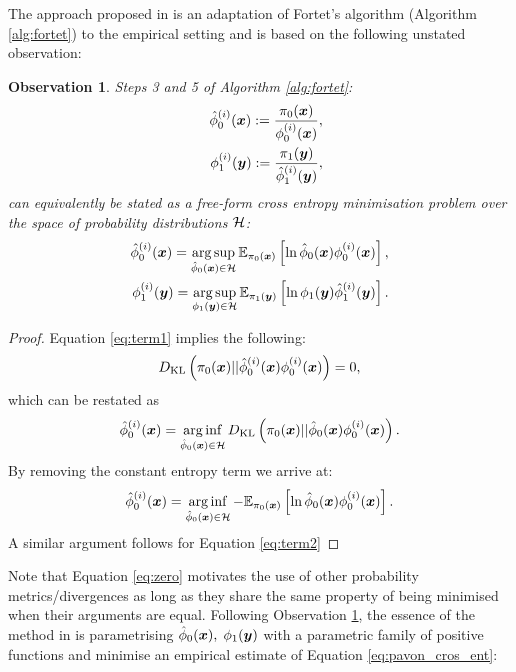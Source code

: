 \documentclass[a4paper,12pt,twoside,openright]{report}
\newtheorem{observation}{Observation}
\theoremstyle{definition}
\begin{document}
The approach proposed in \cite{pavon2018data} is an adaptation of Fortet's algorithm (Algorithm \ref{alg:fortet}) to the empirical setting and is based on the following unstated observation:
\begin{observation}\label{obs:pavon}
Steps 3 and 5 of Algorithm \ref{alg:fortet}:
\begin{align}
    {\hat{\phi}}_0^{(i)}({\bm{x}}) := \frac{\pi_0({\bm{x}})}{\phi_0^{(i)}({\bm{x}})}, \label{eq:term1}\\    \quad \phi_1^{(i)}({\bm{y}}) := \frac{\pi_1({\bm{y}})}{{\hat{\phi}}_1^{(i)}({\bm{y}})} , \label{eq:term2}
\end{align}
can equivalently be stated as a free-form cross entropy minimisation problem over the space of probability distributions ${\mathcal{H}}$:
\begin{align} \label{eq:pavon_cros_ent}
   {\hat{\phi}}_0^{(i)}({\bm{x}})= \operatorname*{arg\,sup}_{{\hat{\phi}}_0({\bm{x}}) \in {\mathcal{H}}} \mathbb{E}_{\pi_0({\bm{x}})} \left[\operatorname{ln} {\hat{\phi}}_0({\bm{x}})   \phi_0^{(i)}({\bm{x}})\right],\\
   \phi_1^{(i)}({\bm{y}})= \operatorname*{arg\,sup}_{\phi_1({\bm{y}}) \in {\mathcal{H}}} \mathbb{E}_{\pi_1({\bm{y}})} \left[\operatorname{ln} \phi_1({\bm{y}})   {\hat{\phi}}_1^{(i)}({\bm{y}})\right].
\end{align}
\end{observation}
\begin{proof}
Equation \ref{eq:term1}  implies the following:
\begin{align}\label{eq:zero}
    D_{\mathrm{KL}}\left(\pi_0({\bm{x}}) || {\hat{\phi}}_0^{(i)}({\bm{x}})   \phi_0^{(i)}({\bm{x}}) \right)  = 0 ,
\end{align} 
which can be restated as
\begin{align}
   {\hat{\phi}}_0^{(i)}({\bm{x}}) = \operatorname*{arg\,inf}_{{\hat{\phi}}_0({\bm{x}})\in \mathcal{H}} D_{\mathrm{KL}}\left(\pi_0({\bm{x}}) || {\hat{\phi}}_0({\bm{x}})   \phi_0^{(i)}({\bm{x}}) \right). 
\end{align} 
By removing the constant entropy term we arrive at:
\begin{align*}
   {\hat{\phi}}_0^{(i)}({\bm{x}})= \operatorname*{arg\,inf}_{{\hat{\phi}}_0({\bm{x}}) \in {\mathcal{H}}} -\mathbb{E}_{\pi_0({\bm{x}})} \left[\operatorname{ln} {\hat{\phi}}_0({\bm{x}})   \phi_0^{(i)}({\bm{x}})\right].
\end{align*}
A similar argument follows for Equation \ref{eq:term2}
\end{proof}
Note that Equation \ref{eq:zero} motivates the use of other probability metrics/divergences as long as they share the same property of being minimised  when their arguments are equal. Following Observation \ref{obs:pavon}, the essence of the method in \cite{pavon2018data} is parametrising  ${\hat{\phi}}_0({\bm{x}}), \;  \phi_1({\bm{y}}) $ with a parametric family of positive functions and minimise an empirical estimate of Equation \ref{eq:pavon_cros_ent}:
\end{document}
